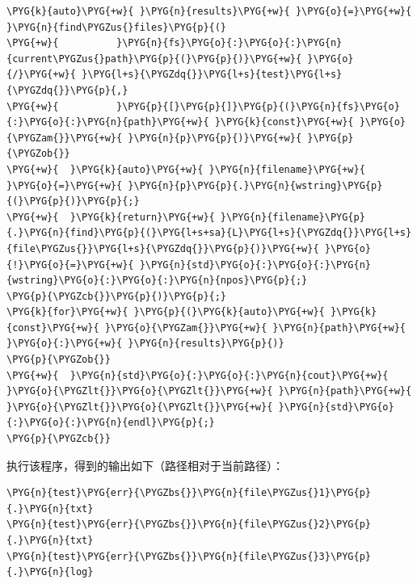 \begin{codeblockbg}
\begin{Verbatim}[commandchars=\\\{\},breaklines=true,breakanywhere=true,fontsize=\codefont,xleftmargin=17bp]
\PYG{k}{auto}\PYG{+w}{ }\PYG{n}{results}\PYG{+w}{ }\PYG{o}{=}\PYG{+w}{ }\PYG{n}{find\PYGZus{}files}\PYG{p}{(}
\PYG{+w}{          }\PYG{n}{fs}\PYG{o}{:}\PYG{o}{:}\PYG{n}{current\PYGZus{}path}\PYG{p}{(}\PYG{p}{)}\PYG{+w}{ }\PYG{o}{/}\PYG{+w}{ }\PYG{l+s}{\PYGZdq{}}\PYG{l+s}{test}\PYG{l+s}{\PYGZdq{}}\PYG{p}{,}
\PYG{+w}{          }\PYG{p}{[}\PYG{p}{]}\PYG{p}{(}\PYG{n}{fs}\PYG{o}{:}\PYG{o}{:}\PYG{n}{path}\PYG{+w}{ }\PYG{k}{const}\PYG{+w}{ }\PYG{o}{\PYGZam{}}\PYG{+w}{ }\PYG{n}{p}\PYG{p}{)}\PYG{+w}{ }\PYG{p}{\PYGZob{}}
\PYG{+w}{  }\PYG{k}{auto}\PYG{+w}{ }\PYG{n}{filename}\PYG{+w}{ }\PYG{o}{=}\PYG{+w}{ }\PYG{n}{p}\PYG{p}{.}\PYG{n}{wstring}\PYG{p}{(}\PYG{p}{)}\PYG{p}{;}
\PYG{+w}{  }\PYG{k}{return}\PYG{+w}{ }\PYG{n}{filename}\PYG{p}{.}\PYG{n}{find}\PYG{p}{(}\PYG{l+s+sa}{L}\PYG{l+s}{\PYGZdq{}}\PYG{l+s}{file\PYGZus{}}\PYG{l+s}{\PYGZdq{}}\PYG{p}{)}\PYG{+w}{ }\PYG{o}{!}\PYG{o}{=}\PYG{+w}{ }\PYG{n}{std}\PYG{o}{:}\PYG{o}{:}\PYG{n}{wstring}\PYG{o}{:}\PYG{o}{:}\PYG{n}{npos}\PYG{p}{;}
\PYG{p}{\PYGZcb{}}\PYG{p}{)}\PYG{p}{;}
\PYG{k}{for}\PYG{+w}{ }\PYG{p}{(}\PYG{k}{auto}\PYG{+w}{ }\PYG{k}{const}\PYG{+w}{ }\PYG{o}{\PYGZam{}}\PYG{+w}{ }\PYG{n}{path}\PYG{+w}{ }\PYG{o}{:}\PYG{+w}{ }\PYG{n}{results}\PYG{p}{)}
\PYG{p}{\PYGZob{}}
\PYG{+w}{  }\PYG{n}{std}\PYG{o}{:}\PYG{o}{:}\PYG{n}{cout}\PYG{+w}{ }\PYG{o}{\PYGZlt{}}\PYG{o}{\PYGZlt{}}\PYG{+w}{ }\PYG{n}{path}\PYG{+w}{ }\PYG{o}{\PYGZlt{}}\PYG{o}{\PYGZlt{}}\PYG{+w}{ }\PYG{n}{std}\PYG{o}{:}\PYG{o}{:}\PYG{n}{endl}\PYG{p}{;}
\PYG{p}{\PYGZcb{}}
\end{Verbatim}
\end{codeblockbg}



执行该程序，得到的输出如下（路径相对于当前路径）：



\begin{codeblockbg}
\begin{Verbatim}[commandchars=\\\{\},breaklines=true,breakanywhere=true,fontsize=\codefont,xleftmargin=17bp]
\PYG{n}{test}\PYG{err}{\PYGZbs{}}\PYG{n}{file\PYGZus{}1}\PYG{p}{.}\PYG{n}{txt}
\PYG{n}{test}\PYG{err}{\PYGZbs{}}\PYG{n}{file\PYGZus{}2}\PYG{p}{.}\PYG{n}{txt}
\PYG{n}{test}\PYG{err}{\PYGZbs{}}\PYG{n}{file\PYGZus{}3}\PYG{p}{.}\PYG{n}{log}
\end{Verbatim}
\end{codeblockbg}


